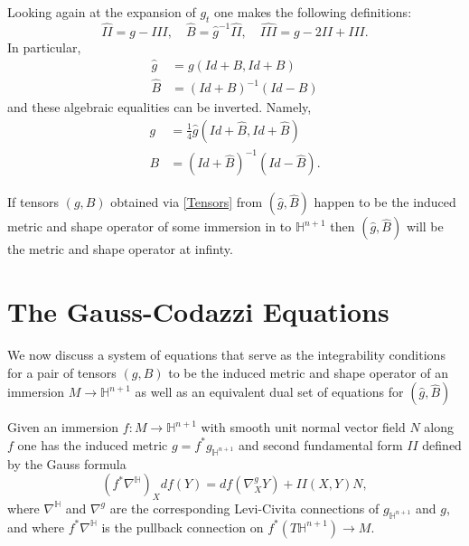 \documentclass{amsart}
\newcommand{\two}{I\!\!I}
\newcommand{\three}{I\!\!I\!\!I}
\renewcommand{\H}{\mathbb{H}}
\begin{document}
Looking again at the expansion of $g_t$ one makes the following definitions:
\[
\hat{\two} = g - \three, \quad \hat{B} = \hat{g}^{-1}\hat{\two}, \quad \hat{\three} = g - 2\two + \three.
\]
In particular,
\begin{equation}
\label{TensorsAtInfinity}
\begin{aligned}
\hat{g} &= g(Id+B, Id + B) \\
\hat{B} &= (Id + B)^{-1}(Id-B)
\end{aligned}
\end{equation}
and these algebraic equalities can be inverted. Namely,
\begin{equation}
\label{Tensors}
\begin{aligned} 
g &= \frac{1}{4}\hat{g}(Id + \hat{B}, Id + \hat{B}) \\
B &= (Id + \hat{B})^{-1}(Id - \hat{B}).
\end{aligned}
\end{equation}

If tensors $(g,B)$ obtained via \eqref{Tensors} from $(\hat{g},\hat{B})$ happen to be the induced metric and shape operator of some immersion in to $\H^{n+1}$ then $(\hat{g},\hat{B})$ will be the metric and shape operator at infinty. 


\section{The Gauss-Codazzi Equations}
We now discuss a system of equations that serve as the integrability conditions for a pair of tensors $(g,B)$ to be the induced metric and shape operator of an immersion $M \to \H^{n+1}$ as well as an equivalent dual set of equations for $(\hat{g},\hat{B})$

Given an immersion $f: M \to \H^{n+1}$ with smooth unit normal vector field $N$ along $f$ one has the induced metric $g = f^*g_{\H^{n+1}}$ and second fundamental form $\two$ defined by the Gauss formula
\[
(f^*\nabla^{\H})_Xdf(Y) = df(\nabla^g_XY) + \two(X,Y)N,
\]
where $\nabla^\H$ and $\nabla^g$ are the corresponding Levi-Civita connections of $g_{\H^{n+1}}$ and $g$, and where $f^*\nabla^\H$ is the pullback connection on $f^*(T\H^{n+1}) \to M$.
\end{document}
